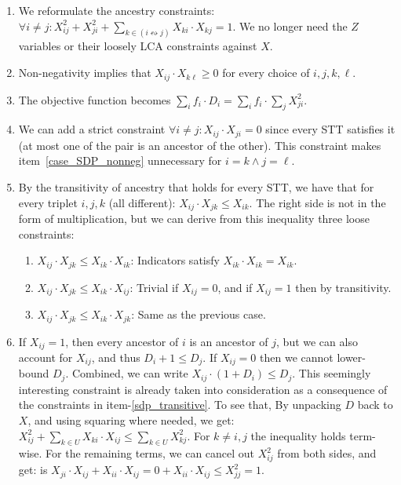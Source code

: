 \begin{enumerate}
    \item \label{case_SDP_ancestry} We reformulate the ancestry constraints: $\forall i \ne j: X_{ij}^2 + X_{ji}^2 + \sum_{k \in (i \leftrightsquigarrow j)}{X_{ki} \cdot X_{kj}} = 1$. We no longer need the $Z$ variables or their loosely LCA constraints against $X$.
    
    \item \label{case_SDP_nonneg} Non-negativity implies that $X_{ij} \cdot X_{k\ell} \ge 0$ for every choice of $i,j,k,\ell$.

    \item The objective function becomes $\sum_{i}{f_i \cdot D_i} = \sum_{i}{f_i \cdot \sum_{j}{X_{ji}^2}}$.

    \item \label{case_SDP_ijji} We can add a strict constraint $\forall i \ne j: X_{ij} \cdot X_{ji} = 0$ since every STT satisfies it (at most one of the pair is an ancestor of the other). This constraint makes item~\ref{case_SDP_nonneg} unnecessary for $i=k \wedge j=\ell$.

    \item \label{sdp_transitive} By the transitivity of ancestry that holds for every STT, we have that for every triplet $i,j,k$ (all different):
    $X_{ij} \cdot X_{jk} \le X_{ik}$. The right side is not in the form of multiplication, but we can derive from this inequality three loose constraints:
    \begin{enumerate}
        \item $X_{ij} \cdot X_{jk} \le X_{ik} \cdot X_{ik}$: Indicators satisfy $X_{ik} \cdot X_{ik} = X_{ik}$.
        \item $X_{ij} \cdot X_{jk} \le X_{ik} \cdot X_{ij}$: Trivial if $X_{ij}=0$, and if $X_{ij}=1$ then by transitivity.
        \item $X_{ij} \cdot X_{jk} \le X_{ik} \cdot X_{jk}$: Same as the previous case.
    \end{enumerate}

    \item If $X_{ij} = 1$, then every ancestor of $i$ is an ancestor of $j$, but we can also account for $X_{ij}$, and thus $D_i + 1 \le D_j$. If $X_{ij} = 0$ then we cannot lower-bound $D_j$. Combined, we can write $X_{ij} \cdot (1 + D_i) \le D_j$. This seemingly interesting constraint is already taken into consideration as a consequence of the constraints in item-\ref{sdp_transitive}. To see that, By unpacking $D$ back to $X$, and using squaring where needed, we get: $X_{ij}^2 + \sum_{k \in U}{X_{ki} \cdot X_{ij}} \le \sum_{k \in U}{X_{kj}^2}$. For $k \ne i,j$ the inequality holds term-wise. For the remaining terms, we can cancel out $X_{ij}^2$ from both sides, and get: is $X_{ji} \cdot X_{ij}  + X_{ii} \cdot X_{ij} = 0 + X_{ii} \cdot X_{ij} \le X_{jj}^2 = 1$.
    

\end{enumerate}
